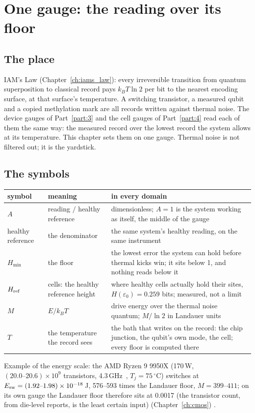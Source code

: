 \chapter{One gauge: the reading over its floor}\label{ch:onegauge}

\section*{The place}
IAM's Law (Chapter~\ref{ch:iams_law}): every irreversible transition from quantum superposition to classical record pays $k_BT\ln2$ per bit to
the nearest encoding surface, at that surface's temperature. A switching transistor, a measured qubit and a copied methylation mark are all
records written against thermal noise. The device gauges of Part~\ref{part:3} and the cell gauges of Part~\ref{part:4} read each of them the same
way: the measured record over the lowest record the system allows at its temperature. This chapter sets them on one gauge. Thermal noise is not
filtered out; it is the yardstick.

\section{The symbols}
\begin{center}\small\begin{tabular}{p{}p{}p{}}\toprule
symbol & meaning & in every domain\\\midrule
$A$ & reading $/$ healthy reference & dimensionless; $A=1$ is the system working as itself, the middle of the gauge\\
healthy reference & the denominator & the same system's healthy reading, on the same instrument\\
$H_{\min}$ & the floor & the lowest error the system can hold before thermal kicks win; it sits below 1, and nothing reads below it\\
$H_{\rm ref}$ & cells: the healthy reference height & where healthy cells actually hold their sites, $H(\varepsilon_0)=0.259$ bits; measured, not a limit\\
$M$ & $E/k_BT$ & drive energy over the thermal noise quantum; $M/\ln2$ in Landauer units\\
$T$ & the temperature the record sees & the bath that writes on the record: the chip junction, the qubit's own mode, the cell; every floor is computed there\\\bottomrule
\end{tabular}\end{center}
Example of the energy scale: the AMD Ryzen 9 9950X (170\,W, $(20.0\text{--}20.6)\times10^9$ transistors, 4.3\,GHz~\cite{AMD9950X}, $T_j=75\,^\circ$C) switches at
$E_{\rm sw}=(1.92\text{--}1.98)\times10^{-18}$\,J, 576--593 times the Landauer floor, $M=399$--$411$; on its own gauge the Landauer floor therefore sits at 0.0017
(the transistor count, from die-level reports, is the least certain input)
(Chapter~\ref{ch:cmos}) \calc.

